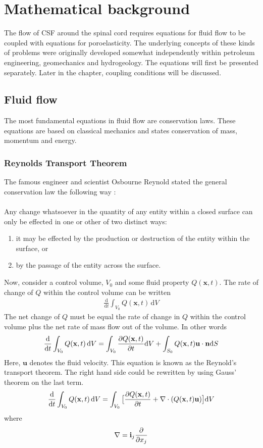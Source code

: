 \chapter{Mathematical background}
The flow of CSF around the spinal cord requires equations for fluid flow to be coupled with equations for poroelasticity. The underlying concepts of these kinds of problems were originally developed somewhat independently within petroleum engineering, geomechanics and hydrogeology. The equations will first be presented separately. Later in the chapter, coupling conditions will be discussed. 
\section{Fluid flow}
The most fundamental equations in fluid flow are conservation laws. These equations are based on classical mechanics and states conservation of mass, momentum and energy. 

\subsection{Reynolds Transport Theorem}
The famous engineer and scientist Osbourne Reynold stated the general conservation law the following way \cite{Reynolds1903}:
\\
\\
Any change whatsoever in the quantity of any entity within a closed surface can only be effected in one or other of two distinct ways:
\begin{enumerate}
\item it may be effected by the production or destruction of the entity within the surface, or
\item by the passage of the entity across the surface.
\end{enumerate}

Now, consider a control volume, $V_0$ and some fluid property $Q(\mathbf{x},t)$. The rate of change of $Q$ within the control volume can be written
\begin{align}
\frac{\mathrm{d}}{\mathrm{d}t} \int_{V_0} Q(\mathbf{x},t) \, \mathrm{d}V \label{Rate_of_change}
\end{align}
The net change of $Q$ must be equal the rate of change in $Q$ within the control volume plus the net rate of mass flow out of the volume. In other words
\begin{align}
\frac{\mathrm{d}}{\mathrm{d}t} \int_{V_0} Q(\mathbf{x},t) \, \mathrm{d}V = \int_{V_0} \frac{\partial Q(\mathbf{x},t)}{\partial t} \mathrm{d}V + \int_{S_0} Q(\mathbf{x},t) \mathbf{u} \cdot \mathbf{n} \mathrm{d}S \label{Reynolds}
\end{align}
Here, $\mathbf{u}$ denotes the fluid velocity. This equation is known as the Reynold's transport theorem. The right hand side could be rewritten by using Gauss' theorem on the last term. 
\begin{align}
\frac{\mathrm{d}}{\mathrm{d}t} \int_{V_0} Q(\mathbf{x},t) \, \mathrm{d}V = \int_{V_0} \big{[}\frac{\partial Q(\mathbf{x},t)}{\partial t} + \nabla \cdot (Q(\mathbf{x},t) \mathbf{u}) \big{]}\mathrm{d}V \label{Reynold}
\end{align}
where \[ \nabla = \mathbf{i}_j\frac{\partial }{\partial x_j} \]

